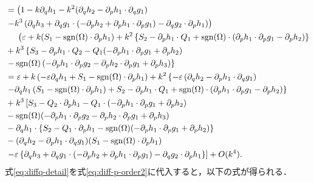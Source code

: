 \documentclass[../main]{subfiles}
\begin{document}
\begin{align}
        &=\left(1-k\partial_q h_1-k^2(\partial_q h_2-\partial_p h_1\cdot \partial_q g_1)\right.\notag\\
        &\left.-k^3\left(\partial_q h_3+\partial_qg_1\cdot(-\partial_ph_2+\partial_ph_1\cdot\partial_pg_1)-\partial_qg_2\cdot\partial_ph_1\right)\right)\notag\\
        &\quad\ \left(\varepsilon +k(S_1-\operatorname{sgn}(\Omega)\cdot \partial_ph_1)+k^2\left\{S_2-\partial_ph_1\cdot Q_1+\operatorname{sgn}(\Omega)\cdot(\partial_ph_1\cdot\partial_pg_1-\partial_ph_2)\right\}\right.\notag\\
        &+k^3\left\{S_3-\partial_ph_1\cdot Q_2-Q_1(-\partial_ph_1\cdot \partial_pg_1+\partial_ph_2)\right.\notag\\
        &\left.-\operatorname{sgn}(\Omega)\left(-\partial_ph_1\cdot\partial_pg_2-\partial_ph_2\cdot\partial_pg_1+\partial_ph_3\right)\right\}\\
        &=\varepsilon+k\left(-\varepsilon\partial_q h_1+S_1-\operatorname{sgn}(\Omega)\cdot\partial_p h_1\right)+k^2\left\{-\varepsilon \left(\partial_q h_2-\partial_p h_1\cdot \partial_q g_1\right)\right.\notag\\
        &\left.-\partial_q h_1\left(S_1-\operatorname{sgn}(\Omega)\cdot\partial_p h_1\right)+S_2-\partial_p h_1\cdot Q_1+\operatorname{sgn}(\Omega)\cdot(\partial_p h_1\cdot \partial_p g_1-\partial_p h_2)\right\}\notag\\
        &+k^3\left[S_3-Q_2\cdot\partial_ph_1-Q_1\cdot\left(-\partial_ph_1\cdot\partial_pg_1+\partial_ph_2\right)\right.\notag\\
        &-\operatorname{sgn}(\Omega)(-\partial_ph_1\cdot\partial_pg_2-\partial_ph_2\cdot\partial_pg_1+\partial_ph_3)\notag\\
        &-\partial_qh_1\cdot\left\{S_2-Q_1\cdot\partial_ph_1-\operatorname{sgn}(\Omega) (-\partial_ph_1\cdot\partial_pg_1+\partial_ph_2)\right\}\notag\\
        &-(\partial_qh_2-\partial_ph_1\cdot\partial_qg_1)(S_1-\operatorname{sgn}(\Omega)\cdot\partial_ph_1)\notag\\
        &\left.-\varepsilon\left\{\partial_qh_3+\partial_qg_1\cdot(-\partial_ph_2+\partial_ph_1\cdot\partial_pg_1)-\partial_qg_2\cdot\partial_ph_1\right\}\right]+O(k^4).
        \label{eq:diffq-detail}
    \end{align}
    式\eqref{eq:diffq-detail}を式\eqref{eq:diff-p-order2}に代入すると，以下の式が得られる．
\end{document}
